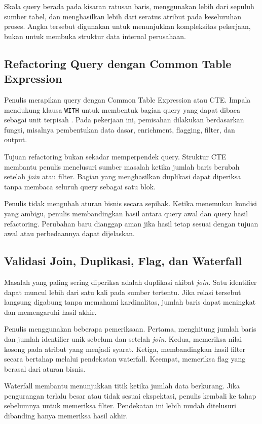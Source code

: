 Skala query berada pada kisaran ratusan baris, menggunakan lebih dari sepuluh sumber tabel, dan menghasilkan lebih dari seratus atribut pada keseluruhan proses. Angka tersebut digunakan untuk menunjukkan kompleksitas pekerjaan, bukan untuk membuka struktur data internal perusahaan.

\subsection{Refactoring Query dengan Common Table Expression}
Penulis merapikan query dengan Common Table Expression atau CTE. Impala mendukung klausa \texttt{WITH} untuk membentuk bagian query yang dapat dibaca sebagai unit terpisah \autocite{impala2026sql}. Pada pekerjaan ini, pemisahan dilakukan berdasarkan fungsi, misalnya pembentukan data dasar, enrichment, flagging, filter, dan output.

Tujuan refactoring bukan sekadar memperpendek query. Struktur CTE membantu penulis menelusuri sumber masalah ketika jumlah baris berubah setelah \textit{join} atau filter. Bagian yang menghasilkan duplikasi dapat diperiksa tanpa membaca seluruh query sebagai satu blok.

Penulis tidak mengubah aturan bisnis secara sepihak. Ketika menemukan kondisi yang ambigu, penulis membandingkan hasil antara query awal dan query hasil refactoring. Perubahan baru dianggap aman jika hasil tetap sesuai dengan tujuan awal atau perbedaannya dapat dijelaskan.

\subsection{Validasi Join, Duplikasi, Flag, dan Waterfall}
Masalah yang paling sering diperiksa adalah duplikasi akibat \textit{join}. Satu identifier dapat muncul lebih dari satu kali pada sumber tertentu. Jika relasi tersebut langsung digabung tanpa memahami kardinalitas, jumlah baris dapat meningkat dan memengaruhi hasil akhir.

Penulis menggunakan beberapa pemeriksaan. Pertama, menghitung jumlah baris dan jumlah identifier unik sebelum dan setelah \textit{join}. Kedua, memeriksa nilai kosong pada atribut yang menjadi syarat. Ketiga, membandingkan hasil filter secara bertahap melalui pendekatan waterfall. Keempat, memeriksa flag yang berasal dari aturan bisnis.

Waterfall membantu menunjukkan titik ketika jumlah data berkurang. Jika pengurangan terlalu besar atau tidak sesuai ekspektasi, penulis kembali ke tahap sebelumnya untuk memeriksa filter. Pendekatan ini lebih mudah ditelusuri dibanding hanya memeriksa hasil akhir.

